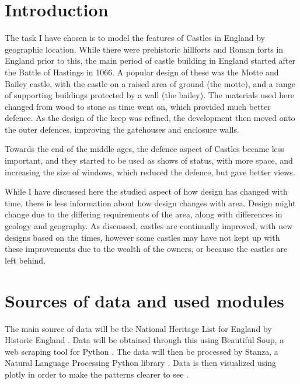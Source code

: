 \documentclass[11pt]{article}
\begin{document}
\maketitle

\section{Introduction}

The task I have chosen is to model the features of Castles in England by geographic location. While there were prehistoric hillforts and Roman forts in England prior to this, the main period of castle building in England started after the Battle of Hastings in 1066. A popular design of these was the Motte and Bailey castle, with the castle on a raised area of ground (the motte), and a range of supporting buildings protected by a wall (the bailey). The materials used here changed from wood to stone as time went on, which provided much better defence. As the design of the keep was refined, the development then moved onto the outer defences, improving the gatehouses and enclosure walls.

Towards the end of the middle ages, the defence aspect of Castles became less important, and they started to be used as shows of status, with more space, and increasing the size of windows, which reduced the defence, but gave better views.

While I have discussed here the studied aspect of how design has changed with time, there is less information about how design changes with area. Design might change due to the differing requirements of the area, along with differences in geology and geography. As discussed, castles are continually improved, with new designs based on the times, however some castles may have not kept up with these improvements due to the wealth of the owners, or because the castles are left behind.


\section{Sources of data and used modules}

The main source of data will be the National Heritage List for England by Historic England \cite{nhle}. Data will be obtained through this using Beautiful Soup, a web scraping tool for Python \cite{bs}. The data will then be processed by Stanza, a Natural Language Processing Python library \cite{qi2020stanza}. Data is then visualized using plotly in order to make the patterns clearer to see \cite{plotly}.
\end{document}
